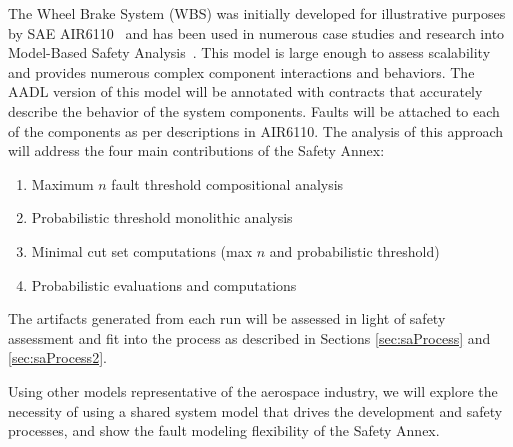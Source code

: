 The Wheel Brake System (WBS) was initially developed for illustrative purposes by SAE AIR6110~\cite{AIR6110} and has been used in numerous case studies and research into Model-Based Safety Analysis~\cite{Stewart17:IMBSA,DBLP:conf/cav/BozzanoCPJKPRT15,mcmillan2019increasing,cimatti2016temporal,cimatti2018tightening,konrad2016faa}. This model is large enough to assess scalability and provides numerous complex component interactions and behaviors. The AADL version of this model will be annotated with \agree contracts that accurately describe the behavior of the system components. Faults will be attached to each of the components as per descriptions in AIR6110. The analysis of this approach will address the four main contributions of the Safety Annex: 
\begin{enumerate}
    \item Maximum $n$ fault threshold compositional analysis
    \item Probabilistic threshold monolithic analysis 
    \item Minimal cut set computations (max $n$ and probabilistic threshold)
    \item Probabilistic evaluations and computations
\end{enumerate}

The artifacts generated from each run will be assessed in light of safety assessment and fit into the process as described in Sections \ref{sec:saProcess} and \ref{sec:saProcess2}.

Using other models representative of the aerospace industry, we will explore the necessity of using a shared system model that drives the development and safety processes, and show the fault modeling flexibility of the Safety Annex. 











